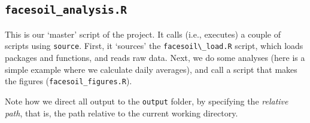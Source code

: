 \documentclass[]{book}
\newenvironment{Shaded}{\begin{snugshade}}{\end{snugshade}}
\newcommand{\CommentTok}[1]{\textcolor[rgb]{0.56,0.35,0.01}{\textit{#1}}}
\newcommand{\DataTypeTok}[1]{\textcolor[rgb]{0.13,0.29,0.53}{#1}}
\newcommand{\KeywordTok}[1]{\textcolor[rgb]{0.13,0.29,0.53}{\textbf{#1}}}
\newcommand{\NormalTok}[1]{#1}
\newcommand{\OperatorTok}[1]{\textcolor[rgb]{0.81,0.36,0.00}{\textbf{#1}}}
\newcommand{\OtherTok}[1]{\textcolor[rgb]{0.56,0.35,0.01}{#1}}
\newcommand{\StringTok}[1]{\textcolor[rgb]{0.31,0.60,0.02}{#1}}
\begin{document}
\hypertarget{facesoil_analysis.r}{%
\subsection{\texorpdfstring{\texttt{facesoil\_analysis.R}}{facesoil\_analysis.R}}\label{facesoil_analysis.r}}

This is our `master' script of the project. It calls (i.e., executes) a couple of scripts using \texttt{source}. First, it `sources' the \texttt{facesoil\textbackslash{}\_load.R} script, which loads packages and functions, and reads raw data. Next, we do some analyses (here is a simple example where we calculate daily averages), and call a script that makes the figures (\texttt{facesoil\_figures.R}).

Note how we direct all output to the \texttt{output} folder, by specifying the \emph{relative path}, that is, the path relative to the current working directory.

\begin{Shaded}
\end{Shaded}
\end{document}
